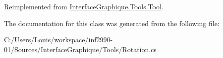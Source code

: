 Reimplemented from \hyperlink{class_interface_graphique_1_1_tools_1_1_tool_aedd1c93f96ee602475b7cbc3c9c99baa}{Interface\+Graphique.\+Tools.\+Tool}.



The documentation for this class was generated from the following file\+:\begin{DoxyCompactItemize}
\item 
C\+:/\+Users/\+Louis/workspace/inf2990-\/01/\+Sources/\+Interface\+Graphique/\+Tools/Rotation.\+cs\end{DoxyCompactItemize}
